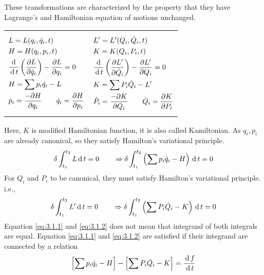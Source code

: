 \documentclass[12pt]{article}
\begin{document}
\begin{soln}
    These transformations are characterized by the property that they have Lagrange's and Hamiltonian equation of motions unchanged.
    \begin{center}
        \begin{tabular}{p{5cm}|p{5cm}}
            {\begin{align*}
                &L=L(q_i,\dot{q}_i,t)\\
                &H=H(q_i,p_i,t)\\
                &\frac{\,\mathrm{d}\,}{\,\mathrm{d}\, t}\left( \frac{\partial L}{\partial \dot{q}_i} \right)-\frac{\partial L}{\partial q_i}=0\\
                &H=\sum p_i\dot{q}_i-L\\
                &\dot{p}_i=\frac{-\partial H}{\partial q_i}\qquad\dot{q}_i=\frac{\partial H}{\partial p_i}
            \end{align*}}&{\begin{align*}
                &L'=L'(Q_i,\dot{Q}_i,t)\\
                &K=K(Q_i,P_i,t)\\
                &\frac{\,\mathrm{d}\,}{\,\mathrm{d}\, t}\left( \frac{\partial L'}{\partial \dot{Q}_i} \right)-\frac{\partial L'}{\partial Q_i}=0\\
                &K=\sum P_i\dot{Q}_i-L'\\
                &\dot{P}_i=\frac{-\partial K}{\partial Q_i}\qquad\dot{Q}_i=\frac{\partial K}{\partial P_i}
            \end{align*}}
        \end{tabular}
    \end{center}
    Here, \(K\) is modified Hamiltonian function, it is also called Kamiltonian. As \(q_i,p_i\) are already canonical, so they satisfy Hamilton's variational principle.
    \begin{equation}
        \delta \int_{t_1}^{t_2} L \,\mathrm{d}\, t=0\qquad \Rightarrow\delta \int_{t_1}^{t_2} \left( \sum p_i\dot{q}_i-H \right) \,\mathrm{d}\, t=0 \label{eq:3.1.1}
    \end{equation}
    For \(Q_i\) and \(P_i\) to be canonical, they must satisfy Hamilton's variational principle. i.e.,
    \begin{equation}
        \delta \int_{t_1}^{t_2} L' \,\mathrm{d}\, t=0\qquad \Rightarrow\delta \int_{t_1}^{t_2} \left( \sum P_i\dot{Q}_i-K \right) \,\mathrm{d}\, t=0 \label{eq:3.1.2}
    \end{equation}
    Equation \eqref{eq:3.1.1} and \eqref{eq:3.1.2} does not mean that integrand of both integrals are equal. Equation \eqref{eq:3.1.1} and \eqref{eq:3.1.2} are satisfied if their integrand are connected by a relation
    \[\left[ \sum p_i\dot{q}_i-H \right]-\left[ \sum P_i\dot{Q}_i-K \right]=\frac{\,\mathrm{d}\, f}{\,\mathrm{d}\, t}\]
\end{soln}
\end{document}
